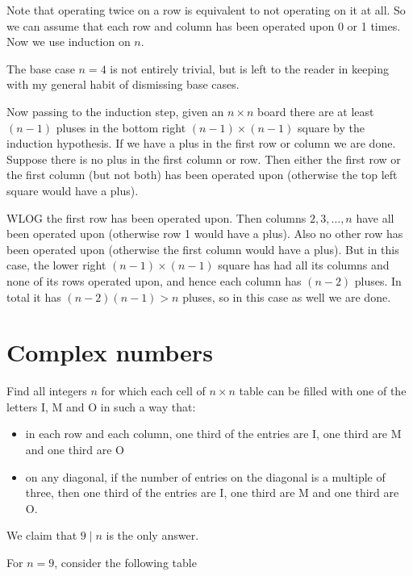 \sol Note that operating twice on a row is equivalent to not operating on it at all. So we can assume that each row and column has been operated upon 0 or 1 times. Now we use induction on $n$.

The base case $n=4$ is not entirely trivial, but is left to the reader in keeping with my general habit of dismissing base cases.

Now passing to the induction step, given an $n\times n$ board there are at least $(n-1)$ pluses in the bottom right $(n-1)\times (n-1)$ square by the induction hypothesis. If we have a plus in the first row or column we are done. Suppose there is no plus in the first column or row. Then either the first row or the first column (but not both) has been operated upon (otherwise the top left square would have a plus).

WLOG the first row has been operated upon. Then columns $2, 3, \dots, n$ have all been operated upon (otherwise row 1 would have a plus). Also no other row has been operated upon (otherwise the first column would have a plus). But in this case, the lower right $(n-1)\times (n-1)$ square has had all its columns and none of its rows operated upon, and hence each column has $(n-2)$ pluses. In total it has $(n-2)(n-1) > n$ pluses, so in this case as well we are done.

\newpage

\section{Complex numbers}

\begin{example}[IMO 2016]
    Find all integers $n$ for which each cell of $n\times n$ table can be filled with one of the letters I, M and O in such a way that:
    \begin{itemize}
        \item in each row and each column, one third of the entries are I, one third are M and one third are O
        \item on any diagonal, if the number of entries on the diagonal is a multiple of three, then one third of the entries are I, one third are M and one third are O.
    \end{itemize}
\end{example}

We claim that $9\mid n$ is the only answer.

For $n=9$, consider the following table

